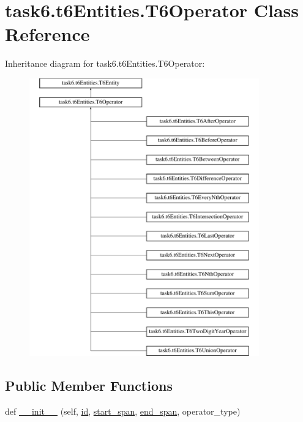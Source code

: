 \hypertarget{classtask6_1_1t6Entities_1_1T6Operator}{}\section{task6.\+t6\+Entities.\+T6\+Operator Class Reference}
\label{classtask6_1_1t6Entities_1_1T6Operator}
Inheritance diagram for task6.\+t6\+Entities.\+T6\+Operator\+:\begin{figure}[H]
\begin{center}
\leavevmode
\includegraphics[height=12.000000cm]{classtask6_1_1t6Entities_1_1T6Operator}
\end{center}
\end{figure}
\subsection*{Public Member Functions}
\begin{DoxyCompactItemize}
\item 
def \hyperlink{classtask6_1_1t6Entities_1_1T6Operator_a2439f51a00c049e0e5e77472e2115b63}{\+\_\+\+\_\+init\+\_\+\+\_\+} (self, \hyperlink{classtask6_1_1t6Entities_1_1T6Entity_afeeced8134bb3ebe0cfecc64d0ab46a4}{id}, \hyperlink{classtask6_1_1t6Entities_1_1T6Entity_a52779e9af8864dc98e8b02fc5b9b041a}{start\+\_\+span}, \hyperlink{classtask6_1_1t6Entities_1_1T6Entity_aeb402200b156cd9562c5111dfe777b98}{end\+\_\+span}, operator\+\_\+type)
\end{DoxyCompactItemize}
